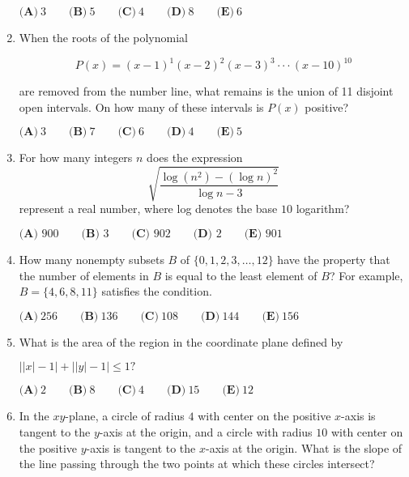 \documentclass{article}
\begin{document}
\begin{enumerate}[label=\arabic*., itemsep=0.5em]
\(\textbf{(A)}~3\qquad\textbf{(B)}~5\qquad\textbf{(C)}~4\qquad\textbf{(D)}~8\qquad\textbf{(E)}~6\)\par \vspace{0.5em}\item When the roots of the polynomial


\begin{equation*}
P(x)  = (x-1)^1 (x-2)^2 (x-3)^3 \cdot \cdot \cdot (x-10)^{10}
\end{equation*}


are removed from the number line, what remains is the union of 11 disjoint open intervals. On how many of these intervals is \(P(x)\) positive?

\(\textbf{(A)}~3\qquad\textbf{(B)}~7\qquad\textbf{(C)}~6\qquad\textbf{(D)}~4\qquad\textbf{(E)}~5\)\par \vspace{0.5em}\item For how many integers \(n\) does the expression
\begin{equation*}
\sqrt{\frac{\log (n^2) - (\log n)^2}{\log n - 3}}
\end{equation*}
represent a real number, where log denotes the base \(10\) logarithm?

\(\textbf{(A) }900 \qquad \textbf{(B) }3\qquad \textbf{(C) }902 \qquad \textbf{(D) } 2  \qquad \textbf{(E) }901\)\par \vspace{0.5em}\item How many nonempty subsets \(B\) of \(\{0, 1, 2, 3, \dots, 12\}\) have the property that the number of elements in \(B\) is equal to the least element of \(B\)? For example, \(B = \{4, 6, 8, 11\}\) satisfies the condition.

\(\textbf{(A)}\ 256 \qquad\textbf{(B)}\ 136 \qquad\textbf{(C)}\ 108 \qquad\textbf{(D)}\ 144 \qquad\textbf{(E)}\ 156\)\par \vspace{0.5em}\item What is the area of the region in the coordinate plane defined by

\(\left||x|-1\right|+\left||y|-1\right|\leq 1?\)

\(\textbf{(A)}~2\qquad\textbf{(B)}~8\qquad\textbf{(C)}~4\qquad\textbf{(D)}~15\qquad\textbf{(E)}~12\)\par \vspace{0.5em}\item In the \(xy\)-plane, a circle of radius \(4\) with center on the positive \(x\)-axis is tangent to the \(y\)-axis at the origin, and a circle with radius \(10\) with center on the positive \(y\)-axis is tangent to the \(x\)-axis at the origin. What is the slope of the line passing through the two points at which these circles intersect?


\end{enumerate}
\end{document}

